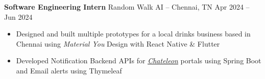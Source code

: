 \documentclass[12pt]{article}       %
\begin{document}
\textbf{Software Engineering Intern} {Random Walk AI} -- Chennai, TN \hfill Apr 2024 -- Jun 2024 \\
\vspace{-9pt}
\begin{itemize}
    \item Designed and built multiple prototypes for a local drinks business
          based in Chennai using \textit{Material You} Design with React Native \& Flutter
    \item Developed Notification Backend APIs for
        \textit{\href{https://chateleon.com}{\underline{Chateleon}}} portals using Spring Boot and
        Email alerts using Thymeleaf
\end{itemize}


\vspace{-18.5pt}


\end{document}

